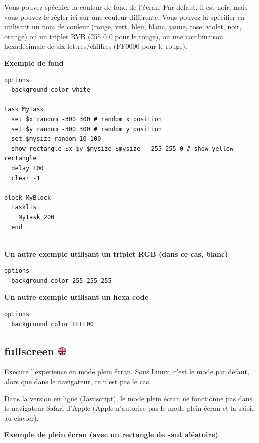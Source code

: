 \documentclass[
]{book}
\begin{document}
Vous pouvez spécifier la couleur de fond de l'écran. Par défaut, il est noir, mais vous pouvez le régler ici sur une couleur différente. Vous pouvez la spécifier en utilisant un nom de couleur (rouge, vert, bleu, blanc, jaune, rose, violet, noir, orange) ou un triplet RVB (255 0 0 pour le rouge), ou une combinaison hexadécimale de six lettres/chiffres (FF0000 pour le rouge).

\textbf{Exemple de fond}

\begin{verbatim}
options
  background color white

task MyTask
  set $x random -300 300 # random x position
  set $y random -300 300 # random y position
  set $mysize random 10 100
  show rectangle $x $y $mysize $mysize   255 255 0 # show yellow rectangle
  delay 100
  clear -1

block MyBlock
  tasklist
    MyTask 200
  end
  
\end{verbatim}

\textbf{Un autre exemple utilisant un triplet RGB (dans ce cas, blanc)}

\begin{verbatim}
options
  background color 255 255 255
\end{verbatim}

\textbf{Un autre exemple utilisant un hexa code}

\begin{verbatim}
options
  background color FFFF00
\end{verbatim}

\hypertarget{fullscreen}{%
\subsection[fullscreen ]{\texorpdfstring{fullscreen \href{https://www.psytoolkit.org/doc3.4.0/syntax.html\#options-fullscreen}{\protect\includegraphics{img/ukflag.png}}}{fullscreen }}\label{fullscreen}}

Exécute l'expérience en mode plein écran. Sous Linux, c'est le mode par défaut, alors que dans le navigateur, ce n'est pas le cas.

Dans la version en ligne (Javascript), le mode plein écran ne fonctionne pas dans le navigateur Safari d'Apple (Apple n'autorise pas le mode plein écran et la saisie au clavier).

\textbf{Exemple de plein écran (avec un rectangle de saut aléatoire)}
\end{document}
